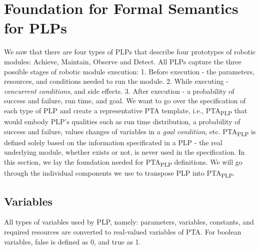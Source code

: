 \chapter{Foundation for Formal Semantics for PLPs \label{foundation_for_formal_semantics_for_plps}}
We saw that there are four types of PLPs that describe four prototypes of robotic modules: Achieve, Maintain, Observe and Detect. All PLPs capture the three possible stages of robotic module execution: 1. Before execution - the parameters, resources, and conditions needed to run the module. 2. While executing - \textit{concurrent conditions}, and side effects. 3. After execution - a probability of success and failure, run time, and goal. We want to go over the specification of each type of PLP and create a representative PTA template, i.e., PTA\textsubscript{PLP} that would embody PLP’s qualities such as run time distribution, a probability of success and failure, values changes of variables in a \textit{\textit{goal condition}}, etc. PTA\textsubscript{PLP} is defined solely based on the information specificated in a PLP - the real underlying module, whether exists or not, is never used in the specification. In this section, we lay the foundation needed for PTA\textsubscript{PLP} definitions. We will go through the individual components we use to transpose PLP into PTA\textsubscript{PLP}.\\
\section{Variables}
All types of variables used by PLP, namely: parameters, variables, constants, and required resources are converted to real-valued variables of PTA. For boolean variables, false is defined as 0, and true as 1.\\
